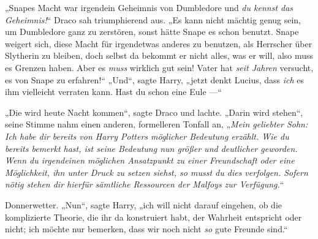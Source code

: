 „Snapes Macht war irgendein Geheimnis von Dumbledore und \emph{du kennst das Geheimnis!}“ Draco sah triumphierend aus.
„Es kann nicht mächtig genug sein, um Dumbledore ganz zu zerstören, sonst hätte Snape es schon benutzt. Snape weigert sich, diese Macht für irgendetwas anderes zu benutzen, als Herrscher über Slytherin zu bleiben, doch selbst da bekommt er nicht alles, was er will, also muss es Grenzen haben. Aber es \emph{muss} wirklich gut sein! Vater hat \emph{seit Jahren} versucht, es von Snape zu erfahren!“
„Und“, sagte Harry, „jetzt denkt Lucius, dass \emph{ich} es ihm vielleicht verraten kann. Hast du schon eine Eule —“

„Die wird heute Nacht kommen“, sagte Draco und lachte.
„Darin wird stehen“, seine Stimme nahm einen anderen, formelleren Tonfall an,
„\emph{Mein geliebter Sohn: Ich habe dir bereits von Harry Potters möglicher Bedeutung erzählt. Wie du bereits bemerkt hast, ist seine Bedeutung nun größer und deutlicher geworden. Wenn du irgendeinen möglichen Ansatzpunkt zu einer Freundschaft oder eine Möglichkeit, ihn unter Druck zu setzen siehst, so musst du dies verfolgen. Sofern nötig stehen dir hierfür sämtliche Ressourcen der Malfoys zur Verfügung.}“

Donnerwetter.
„Nun“, sagte Harry, „ich will nicht darauf eingehen, ob die komplizierte Theorie, die ihr da konstruiert habt, der Wahrheit entspricht oder nicht; ich möchte nur bemerken, dass wir noch nicht \emph{so} gute Freunde sind.“


